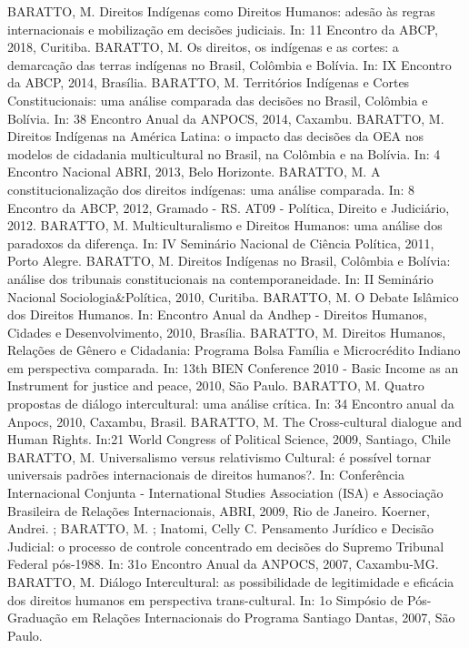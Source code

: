 \begin{cvcitems}
  \cvcitem
    {BARATTO, M.}
    {Direitos Indígenas como Direitos Humanos: adesão às regras internacionais e mobilização em decisões judiciais. In: 11 Encontro da ABCP, 2018, Curitiba.}
  \cvcitem
    {BARATTO, M.}
    {Os direitos, os indígenas e as cortes: a demarcação das terras indígenas no Brasil, Colômbia e Bolívia. In: IX Encontro da ABCP, 2014, Brasília.}
  \cvcitem
    {BARATTO, M.}
    {Territórios Indígenas e Cortes Constitucionais: uma análise comparada das decisões no Brasil, Colômbia e Bolívia. In: 38 Encontro Anual da ANPOCS, 2014, Caxambu.}
  \cvcitem
    {BARATTO, M.}
    {Direitos Indígenas na América Latina: o impacto das decisões da OEA nos modelos de cidadania multicultural no Brasil, na Colômbia e na Bolívia. In: 4 Encontro Nacional ABRI, 2013, Belo Horizonte.}
  \cvcitem
    {BARATTO, M.}
    {A constitucionalização dos direitos indígenas: uma análise comparada. In: 8 Encontro da ABCP, 2012, Gramado - RS. AT09 - Política, Direito e Judiciário, 2012.}
  \cvcitem
    {BARATTO, M.}
    {Multiculturalismo e Direitos Humanos: uma análise dos paradoxos da diferença. In: IV Seminário Nacional de Ciência Política, 2011, Porto Alegre.}
  \cvcitem
    {BARATTO, M.}
    {Direitos Indígenas no Brasil, Colômbia e Bolívia: análise dos tribunais constitucionais na contemporaneidade. In: II Seminário Nacional Sociologia\&Política, 2010, Curitiba.}
  \cvcitem
    {BARATTO, M.}
    {O Debate Islâmico dos Direitos Humanos. In: Encontro Anual da Andhep - Direitos Humanos, Cidades e Desenvolvimento, 2010, Brasília.}
  \cvcitem
    {BARATTO, M.}
    {Direitos Humanos, Relações de Gênero e Cidadania: Programa Bolsa Família e Microcrédito Indiano em perspectiva comparada. In: 13th BIEN Conference 2010 - Basic Income as an Instrument for justice and peace, 2010, São Paulo.}
  \cvcitem
    {BARATTO, M.}
    {Quatro propostas de diálogo intercultural: uma análise crítica. In: 34 Encontro anual da Anpocs, 2010, Caxambu, Brasil.}
  \cvcitem
    {BARATTO, M.}
    {The Cross-cultural dialogue and Human Rights. In:21 World Congress of Political Science, 2009, Santiago, Chile}
  \cvcitem
    {BARATTO, M.}
    {Universalismo versus relativismo Cultural: é possível tornar universais padrões internacionais de direitos humanos?. In: Conferência Internacional Conjunta - International Studies Association (ISA) e Associação Brasileira de Relações Internacionais, ABRI, 2009, Rio de Janeiro.}
  \cvcitem
    {Koerner, Andrei. ; BARATTO, M. ; Inatomi, Celly C.}
    {Pensamento Jurídico e Decisão Judicial: o processo de controle
    concentrado em decisões do Supremo Tribunal Federal pós-1988. In: 31o Encontro Anual da ANPOCS, 2007, Caxambu-MG.}
  \cvcitem
    {BARATTO, M.}
    {Diálogo Intercultural: as possibilidade de legitimidade e eficácia dos direitos humanos em perspectiva trans-cultural. In: 1o Simpósio de Pós-Graduação em Relações Internacionais do Programa Santiago Dantas, 2007, São Paulo.}
\end{cvcitems}
\pagebreak
{}

